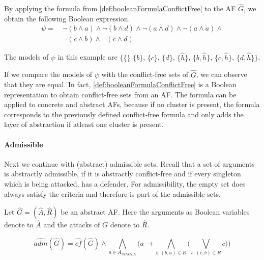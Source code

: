 \begin{example}
By applying the formula from \cref{def:booleanFormulaConflictFree} to the AF $\hat{G}$, we obtain the following Boolean expression.
\begin{align*}
    \psi =\ &
    \lnot(b \land a)  \land
    \lnot(b \land d)  \land
    \lnot(a \land d)  \land
    \lnot(a \land a)  \land
    \\
    & \lnot(c \land b)  \land
    \lnot(c \land d)
\end{align*}

The models of $\psi$ in this example are $\bigl\{\{\}$ $\{b\}$, $\{c\}$, $\{d\}$, $\{\hat{h}\}$, $\{b, \hat{h}\}$, $\{c, \hat{h}\}$, $\{d, \hat{h}\}\bigl\}$.
\end{example}

If we compare the models of $\psi$ with the conflict-free sets of $\hat{G}$, we can observe that they are equal. In fact, \cref{def:booleanFormulaConflictFree} is a Boolean representation to obtain conflict-free sets from an AF. The formula can be applied to concrete and abstract AFs, because if no cluster is present, the formula corresponds to the previously defined conflict-free formula and only adds the layer of abstraction if atleast one cluster is present.


\paragraph{Admissible} Next we continue with (abstract) admissible sets. Recall that a set of arguments is abstractly admissible, if it is abstractly conflict-free and if every singleton which is being attacked, has a defender. For admissibility, the empty set does always satisfy the criteria and therefore is part of the admissible sets.

\begin{definition}
    Let $\hat{G}=(\hat{A}, \hat{R})$ be an abstract AF. Here the arguments as Boolean variables denote to $\hat{A}$ and the attacks of $G$ denote to $\hat{R}$.
    \begin{center}
        \[ \hat{adm}(\hat{G})=
        \hat{cf}(\hat{G}) \land  \bigwedge_{a \in A_{\!S\!I\!N\!G\!L\!E}} \big( a \rightarrow \bigwedge_{b:(b,a) \in R} \big( \bigvee_{c:(c,b) \in R} c\big) \big)
        \]
    \end{center}
    \label{def:booleanFormulaAdmissible}
\end{definition}


